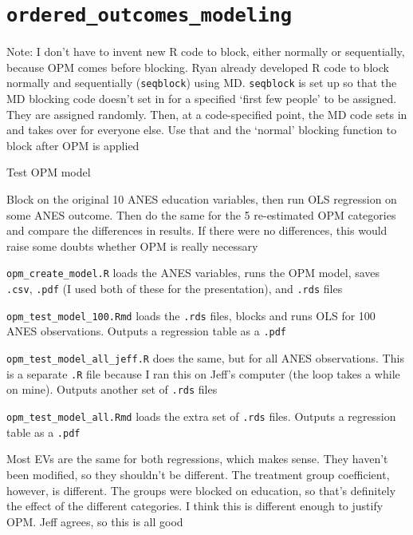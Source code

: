 \section*{\texttt{ordered\_outcomes\_modeling}}
	\begin{coi}
		\item Note: I don't have to invent new R code to block, either normally or sequentially, because OPM comes before blocking. Ryan already developed R code to block normally and sequentially ({\tt seqblock}) using MD. {\tt seqblock} is set up so that the MD blocking code doesn't set in for a specified `first few people' to be assigned. They are assigned randomly. Then, at a code-specified point, the MD code sets in and takes over for everyone else. Use that and the `normal' blocking function to block after OPM is applied
		\item Test OPM model
			\begin{coi}
				\item Block on the original 10 ANES education variables, then run OLS regression on some ANES outcome. Then do the same for the 5 re-estimated OPM categories and compare the differences in results. If there were no differences, this would raise some doubts whether OPM is really necessary
					\begin{coi}
						\item \texttt{opm\_create\_model.R} loads the ANES variables, runs the OPM model, saves \texttt{.csv}, \texttt{.pdf} (I used both of these for the presentation), and \texttt{.rds} files
						\item \texttt{opm\_test\_model\_100.Rmd} loads the \texttt{.rds} files, blocks and runs OLS for 100 ANES observations. Outputs a regression table as a \texttt{.pdf}
						\item \texttt{opm\_test\_model\_all\_jeff.R} does the same, but for all ANES observations. This is a separate \texttt{.R} file because I ran this on Jeff's computer (the loop takes a while on mine). Outputs another set of \texttt{.rds} files
						\item \texttt{opm\_test\_model\_all.Rmd} loads the extra set of \texttt{.rds} files. Outputs a regression table as a \texttt{.pdf}
						\item Most EVs are the same for both regressions, which makes sense. They haven't been modified, so they shouldn't be different. The treatment group coefficient, however, is different. The groups were blocked on education, so that's definitely the effect of the different categories. I think this is different enough to justify OPM. Jeff agrees, so this is all good

\end{coi}
\end{coi}
\end{coi}
